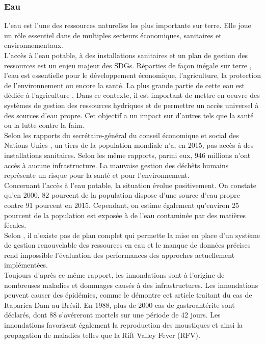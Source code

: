 \documentclass[10pt, conference, compsocconf]{llncs}
\begin{document}
\subsubsection{Eau}
L'eau est l'une des ressources naturelles les plus importante sur terre. Elle joue un rôle essentiel dans de multiples secteurs économiques, sanitaires et environnementaux.\\
L'accès à l'eau potable, à des installations sanitaires et un plan de gestion des ressources est un enjeu majeur des SDGs. Réparties de façon inégale sur terre \cite{lefevre_repartition_nodate}, l'eau est essentielle pour le développement économique, l'agriculture, la protection de l'environnement ou encore la santé. La plus grande partie de cette eau est dédiée à l'agriculture \cite{gwt_global_nodate}. Dans ce contexte, il est important de mettre en oeuvre des systèmes de gestion des ressources hydriques et de permettre un accès universel à des sources d'eau propre. Cet objectif a un impact sur d'autres tels que la santé ou la lutte contre la faim.\\
Selon les rapports du secrétaire-général du conseil économique et social des Nations-Unies \cite{united_nations_economic_and_social_council_progress_2017}\cite{united_nations_economic_and_social_council_progress_2017-1}, un tiers de la population mondiale n'a, en 2015, pas accès à des installations sanitaires. Selon les même rapports, parmi eux, 946 millions n'ont accès à aucune infrastructure. La mauvaise gestion des déchêts humains représente un risque pour la santé et pour l'environnement.\\
Concernant l'accès à l'eau potable, la situation évolue positivement. On constate qu'en 2000, 82 pourcent de la population dispose d'une source d'eau propre contre 91 pourcent en 2015. Cependant, on estime également qu'environ 25 pourcent de la population est exposée à de l'eau contaminée par des matières fécales\cite{sdkp_goal_nodate-4}. \\
Selon \cite{rana_water_2017}, il n'existe pas de plan complet qui permette la mise en place d'un système de gestion renouvelable des ressources en eau et le manque de données précises rend impossible l'évaluation des performances des approches actuellement implémentées. \\
Toujours d'après ce même rapport, les innondations sont à l'origine de nombreuses maladies et dommages causés à des infrastructures. Les innondations peuvent causer des épidémies, comme le démontre cet article \cite{texeira_gastroenteritis_1993} traitant du cas de Itaparica Dam au Brésil. En 1988, plus de 2000 cas de gastroantérite sont déclarés, dont 88 s'avéreront mortels sur une période de 42 jours. Les innondations favorisent également la reproduction des moustiques et ainsi la propagation de maladies telles que la Rift Valley Fever (RFV)\cite{hanafi_rift_2010}.
\end{document}
